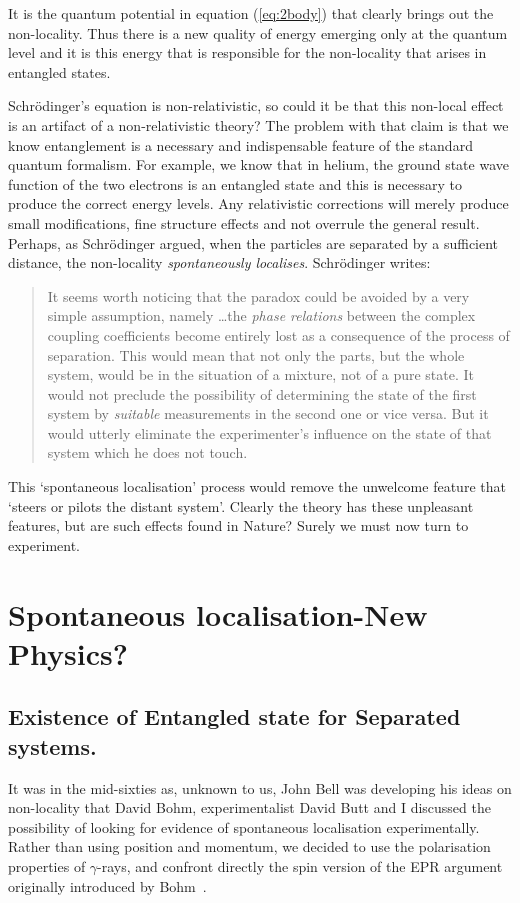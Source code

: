 \documentclass[12pt]{article}
\begin{document}
It is the quantum potential in equation (\ref{eq:2body}) that clearly brings out the non-locality.  Thus there is a new quality of energy emerging only at the quantum level and it is this energy that is responsible for the non-locality that arises in entangled states.


 Schr\"{o}dinger's equation is non-relativistic, so could it be that this non-local effect is an artifact of a non-relativistic theory?
The problem with that claim is that  we know entanglement is a necessary and indispensable feature of the standard quantum formalism. For example, we know that in helium, the ground state wave function of the two electrons is an entangled state and this is necessary to produce the correct energy levels.   Any relativistic corrections will merely produce small modifications, fine structure effects and not overrule the general result.  Perhaps, as Schr\"{o}dinger argued, when the particles are separated by a sufficient distance, the non-locality {\em spontaneously localises}.  Schr\"{o}dinger writes:
\begin{quote}
 It seems worth noticing that the paradox could be avoided by a very simple assumption, namely \dots the
{\em phase relations} between the complex coupling coefficients become entirely lost as a consequence of the process of separation. This would mean that not only the parts, but the whole system, would be in the situation of a mixture, not of a pure state. It would not preclude the possibility of determining the state of the first system by {\em suitable} measurements in the second one or vice versa. But it would utterly eliminate the experimenter's influence on the state of that system which he does not touch.
\end{quote}
This `spontaneous localisation' process would remove the unwelcome feature that `steers or pilots the distant system'.
Clearly the theory has these unpleasant features, but are such effects found in Nature?  Surely we must now turn to experiment.  

\section{Spontaneous localisation-New Physics?}

\subsection{Existence of Entangled state for Separated systems.}

It was in the mid-sixties as, unknown to us, John Bell was developing his ideas on non-locality that David Bohm, experimentalist David Butt and I discussed the possibility of looking for evidence of spontaneous localisation experimentally.  Rather than using position and momentum, we decided to use the polarisation properties of $\gamma$-rays, and confront directly the spin version of the EPR argument originally introduced by Bohm~\cite{db51}.
\end{document}
